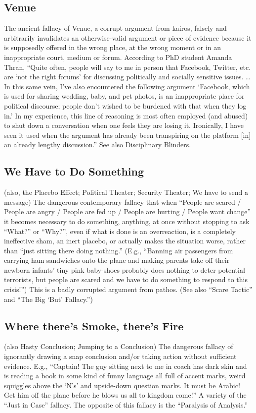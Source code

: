 \documentclass[10pt,a4paper,british]{article}
\begin{document}
\begin{multicols}{2}
	\subsection{Venue} The ancient fallacy of Venue, a corrupt argument from kairos, falsely and arbitrarily invalidates an otherwise{-}valid argument or piece of evidence because it is supposedly offered in the wrong place, at the wrong moment or in an inappropriate court, medium or forum.  According to PhD student Amanda Thran, ``Quite often, people will say to me in person that Facebook, Twitter, etc. are `not the right forums' for discussing politically and socially sensitive issues. \ldots In this same vein, I’ve also encountered the following argument `Facebook, which is used for sharing wedding, baby, and pet photos, is an inappropriate place for political discourse; people don’t wished to be burdened with that when they log in.' In my experience, this line of reasoning is most often employed (and abused) to shut down a conversation when one feels they are losing it.  Ironically, I have seen it used when the argument has already been transpiring on the platform [in] an already lengthy discussion.'' See also Disciplinary Blinders.  

    \subsection{We Have to Do Something} (also,  the Placebo Effect; Political Theater; Security Theater; We have to send a message) The dangerous contemporary fallacy that when ``People are scared / People are angry / People are fed up / People are hurting / People want change'' it becomes necessary to do something, anything, at once without stopping to ask ``What?'' or ``Why?'', even if what is done is an overreaction, is a completely ineffective sham, an inert placebo, or actually makes the situation worse, rather than ``just sitting there doing nothing.'' (E.g., ``Banning air passengers from carrying ham sandwiches onto the plane and making parents take off their newborn infants' tiny pink baby{-}shoes probably does nothing to deter potential terrorists, but people are scared and we have to do something to respond to this crisis!'') This is a badly corrupted argument from pathos. (See also ``Scare Tactic'' and ``The Big `But' Fallacy.'') 

    \subsection{Where there’s Smoke, there’s Fire} (also Hasty Conclusion; Jumping to a Conclusion) The dangerous fallacy of ignorantly drawing a snap conclusion and/or taking action without sufficient evidence. E.g., “Captain! The guy sitting next to me in coach has dark skin and is reading a book in some kind of funny language all full of accent marks, weird squiggles above the `N's' and upside{-}down question marks. It must be Arabic! Get him off the plane before he blows us all to kingdom come!” A variety of the “Just in Case” fallacy. The opposite of this fallacy is the ``Paralysis of Analysis.'' 


\end{multicols}
\end{document}
